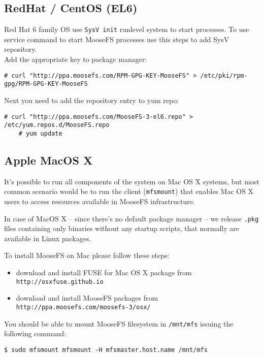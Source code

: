 \documentclass[a4paper,11pt,english]{report}
\def\code#1{\texttt{#1}}
\begin{document}
			\subsection{RedHat / CentOS (EL6)}
			Red Hat 6 family OS use \code{SysV init} runlevel system to start processes. To use service command to start MooseFS processes use this steps to add SysV repository.\\
			Add the appropriate key to package manager:
			\begin{lstlisting}[caption={Adding the repo key}]
	# curl "http://ppa.moosefs.com/RPM-GPG-KEY-MooseFS" > /etc/pki/rpm-gpg/RPM-GPG-KEY-MooseFS
			\end{lstlisting}

			Next you need to add the repository entry to yum repo:
			\begin{lstlisting}[caption={Adding the MooseFS repo}]
	# curl "http://ppa.moosefs.com/MooseFS-3-el6.repo" > /etc/yum.repos.d/MooseFS.repo
	# yum update
			\end{lstlisting}


			\subsection{Apple MacOS X}
			It's possible to run all components of the system on Mac OS X systems, but most common scenario would be to run the client (\code{mfsmount}) that enables Mac OS X users to access resources available in MooseFS infrastructure.
			
			In case of MacOS X -- since there's no default package manager -- we release \code{.pkg} files containing only binaries without any startup scripts, that normally are available in Linux packages.
			
			To install MooseFS on Mac please follow these steps:

			\begin{itemize}
				\item download and install FUSE for Mac OS X package from \\
					\code{http://osxfuse.github.io}
				\item download and install MooseFS packages from \\
					\code{http://ppa.moosefs.com/moosefs-3/osx/}
			\end{itemize}
			
			You should be able to mount MooseFS filesystem in \code{/mnt/mfs} issuing the following command:
			
			\code{\$ sudo mfsmount mfsmount -H mfsmaster.host.name /mnt/mfs}
			
\end{document}
